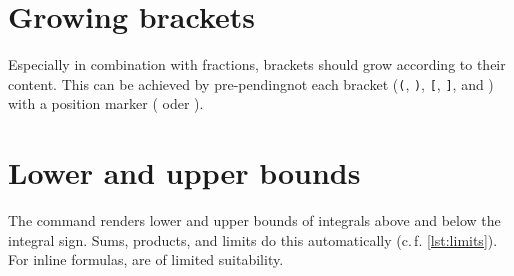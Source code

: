 \begin{table}[H]
\end{table}

\section{Growing brackets}

Especially in combination with fractions, brackets should grow according to their content.
This can be achieved by pre-pendingnot each bracket (\texttt{(}, \texttt{)}, \texttt{[}, \texttt{]}, \texttt{\lbrace} and \texttt{\rbrace}) with a position marker (\texttt{\left} oder \texttt{\right}).


\section{Lower and upper bounds}

The \texttt{\limits} command renders lower and upper bounds of integrals above and below the integral sign.
Sums, products, and limits do this 
automatically (c.\,f. \cref{lst:limits}).
For inline formulas, \texttt{\limits} are of limited suitability.

